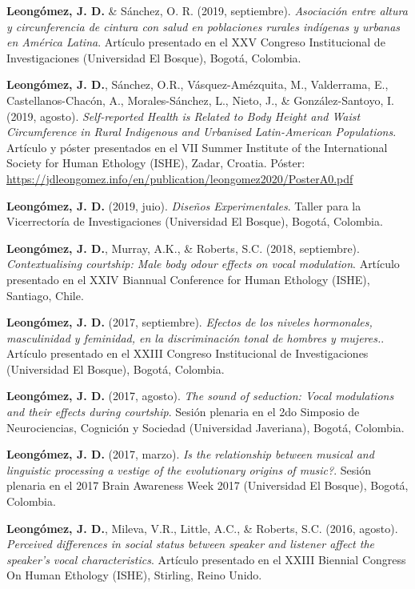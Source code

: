 \documentclass[11pt,a4paper,]{awesome-cv}
\begin{document}
\textbf{Leongómez, J. D.} \& Sánchez, O. R. (2019, septiembre).
\emph{Asociación entre altura y circunferencia de cintura con salud en
poblaciones rurales indígenas y urbanas en América Latina}. Artículo
presentado en el XXV Congreso Institucional de Investigaciones
(Universidad El Bosque), Bogotá, Colombia.

\textbf{Leongómez, J. D.}, Sánchez, O.R., Vásquez-Amézquita, M.,
Valderrama, E., Castellanos-Chacón, A., Morales-Sánchez, L., Nieto, J.,
\& González-Santoyo, I. (2019, agosto). \emph{Self-reported Health is
Related to Body Height and Waist Circumference in Rural Indigenous and
Urbanised Latin-American Populations}. Artículo y póster presentados en
el VII Summer Institute of the International Society for Human Ethology
(ISHE), Zadar, Croatia. Póster:
\url{https://jdleongomez.info/en/publication/leongomez2020/PosterA0.pdf}

\textbf{Leongómez, J. D.} (2019, juio). \emph{Diseños Experimentales}.
Taller para la Vicerrectoría de Investigaciones (Universidad El Bosque),
Bogotá, Colombia.

\textbf{Leongómez, J. D.}, Murray, A.K., \& Roberts, S.C. (2018,
septiembre). \emph{Contextualising courtship: Male body odour effects on
vocal modulation}. Artículo presentado en el XXIV Biannual Conference
for Human Ethology (ISHE), Santiago, Chile.

\textbf{Leongómez, J. D.} (2017, septiembre). \emph{Efectos de los
niveles hormonales, masculinidad y feminidad, en la discriminación tonal
de hombres y mujeres.}. Artículo presentado en el XXIII Congreso
Institucional de Investigaciones (Universidad El Bosque), Bogotá,
Colombia.

\textbf{Leongómez, J. D.} (2017, agosto). \emph{The sound of seduction:
Vocal modulations and their effects during courtship}. Sesión plenaria
en el 2do Simposio de Neurociencias, Cognición y Sociedad (Universidad
Javeriana), Bogotá, Colombia.

\textbf{Leongómez, J. D.} (2017, marzo). \emph{Is the relationship
between musical and linguistic processing a vestige of the evolutionary
origins of music?}. Sesión plenaria en el 2017 Brain Awareness Week 2017
(Universidad El Bosque), Bogotá, Colombia.

\textbf{Leongómez, J. D.}, Mileva, V.R., Little, A.C., \& Roberts, S.C.
(2016, agosto). \emph{Perceived differences in social status between
speaker and listener affect the speaker's vocal characteristics}.
Artículo presentado en el XXIII Biennial Congress On Human Ethology
(ISHE), Stirling, Reino Unido.
\end{document}
